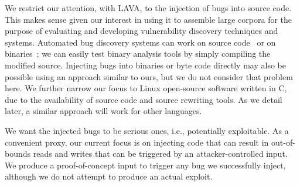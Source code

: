 
We restrict our attention, with LAVA, to the injection of bugs into source code.
This makes sense given our interest in using it to assemble large corpora for the purpose of evaluating and developing vulnerability discovery techniques and systems.
Automated bug discovery systems can work on source
code~\cite{Cadar:2008, Ganesh:2009, Haller:2013, Yamaguchi:2014} or on
binaries~\cite{Cha:2012, Wang:2010};
we can easily test binary analysis tools by simply compiling the modified source.
Injecting bugs into binaries or byte code directly may also be possible using an approach similar to ours, but we do not consider that problem here.
We further narrow our focus to Linux open-source software written in C, due to the availability of source code and source rewriting tools.
As we detail later, a similar approach will work for other languages.

We want the injected bugs to be serious ones, i.e., potentially exploitable.
As a convenient proxy, our current focus is on injecting code that can result in out-of-bounds reads and writes that can be triggered by an attacker-controlled input.
We produce a proof-of-concept input to trigger any bug we successfully inject, although we do not attempt to produce an actual exploit.
